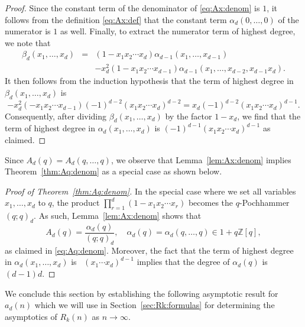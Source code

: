 \documentclass[11pt]{article}
\theoremstyle{plain}
\theoremstyle{definition}
\begin{document}
\begin{proof}
  Since the constant term of the denominator of \eqref{eq:Ax:denom} is $1$, it
  follows from the definition \eqref{eq:Ax:def} that the constant term
  $\alpha_d (0, \ldots, 0)$ of the numerator is $1$ as well. Finally, to
  extract the numerator term of highest degree, we note that
  \begin{eqnarray*}
    \beta_d (x_1, \ldots, x_d) & = & (1 - x_1 x_2 \cdots x_d) \alpha_{d - 1}
    (x_1, \ldots, x_{d - 1})\\
    &  & - x_d^2 (1 - x_1 x_2 \cdots x_{d - 1}) \alpha_{d - 1} (x_1, \ldots,
    x_{d - 2}, x_{d - 1} x_d) .
  \end{eqnarray*}
  It then follows from the induction hypothesis that the term of highest
  degree in $\beta_d (x_1, \ldots, x_d)$ is
  \begin{equation*}
    - x_d^2 (- x_1 x_2 \cdots x_{d - 1}) (- 1)^{d - 2} (x_1 x_2 \cdots
     x_d)^{d - 2} = x_d (- 1)^{d - 2} (x_1 x_2 \cdots x_d)^{d - 1} .
  \end{equation*}
  Consequently, after dividing $\beta_d (x_1, \ldots, x_d)$ by the factor $1 -
  x_d$, we find that the term of highest degree in $\alpha_d (x_1, \ldots,
  x_d)$ is $(- 1)^{d - 1} (x_1 x_2 \cdots x_d)^{d - 1}$ as claimed.
\end{proof}

Since $A_d (q) = A_d (q, \ldots, q)$, we observe that Lemma~\ref{lem:Ax:denom}
implies Theorem~\ref{thm:Aq:denom} as a special case as shown below.

\begin{proof}[Proof of Theorem~\ref{thm:Aq:denom}]
  In the special case where we set all variables $x_1, \ldots, x_d$ to $q$,
  the product $\prod_{r = 1}^d (1 - x_1 x_2 \cdots x_r)$ becomes the
  $q$-Pochhammer $(q ; q)_d$. As such, Lemma~\ref{lem:Ax:denom} shows that
  \begin{equation*}
    A_d (q) = \frac{\alpha_d (q)}{(q ; q)_d}, \quad \alpha_d (q) = \alpha_d
     (q, \ldots, q) \in 1 + q\mathbb{Z} [q],
  \end{equation*}
  as claimed in \eqref{eq:Aq:denom}. Moreover, the fact that the term of
  highest degree in $\alpha_d (x_1, \ldots, x_d)$ is \ $(x_1 \cdots x_d)^{d -
  1}$ implies that the degree of $\alpha_d (q)$ is $(d - 1) d$.
\end{proof}

We conclude this section by establishing the following asymptotic result for
$a_d (n)$ which we will use in Section~\ref{sec:Rk:formulas} for determining
the asymptotics of $R_k (n)$ as $n \rightarrow \infty$.
\end{document}
